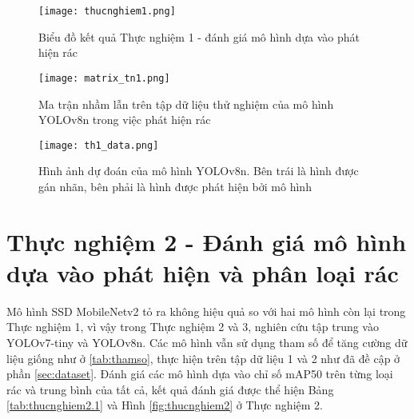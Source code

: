 \documentclass[../the.tex]{subfiles}
\begin{document}
\begin{figure}[H]
    \centering
    \texttt{[image: thucnghiem1.png]}
    \caption{Biểu đồ kết quả Thực nghiệm 1 - đánh giá mô hình dựa vào phát hiện rác}
    \label{fig:thucnghiem1}
\end{figure}

\begin{figure}[H]
    \centering
    \texttt{[image: matrix\_tn1.png]}
    \caption{Ma trận nhầm lẫn trên tập dữ liệu thử nghiệm của mô hình YOLOv8n trong việc phát hiện rác}
    \label{fig:thucnghiem1.2}
\end{figure}

\begin{figure}[H]
    \centering
    \texttt{[image: th1\_data.png]}
    \caption{Hình ảnh dự đoán của mô hình YOLOv8n. Bên trái là hình được gán nhãn, bên phải là hình được phát hiện bởi mô hình}
    \label{fig:thucnghiem1.3}
\end{figure}

\section{Thực nghiệm 2 - Đánh giá mô hình dựa vào phát hiện và phân loại rác}

 {\fontsize{13}{12} \selectfont

  Mô hình SSD MobileNetv2 tỏ ra không hiệu quả so với hai mô hình còn lại trong Thực nghiệm 1, vì vậy trong Thực nghiệm 2 và 3, nghiên cứu tập trung vào YOLOv7-tiny và YOLOv8n. 
  Các mô hình vẫn sử dụng tham số để tăng cường dữ liệu giống như ở \ref{tab:thamso}, thực hiện trên tập dữ liệu 1 và 2 như đã đề cập ở phần \ref{sec:dataset}.
  Đánh giá các mô hình dựa vào chỉ số mAP50 trên từng loại rác và trung bình của tất cả, kết quả đánh giá được thể hiện Bảng \ref{tab:thucnghiem2.1} và Hình \ref{fig:thucnghiem2} ở Thực nghiệm 2.
 
  }

\bigskip
\end{document}
